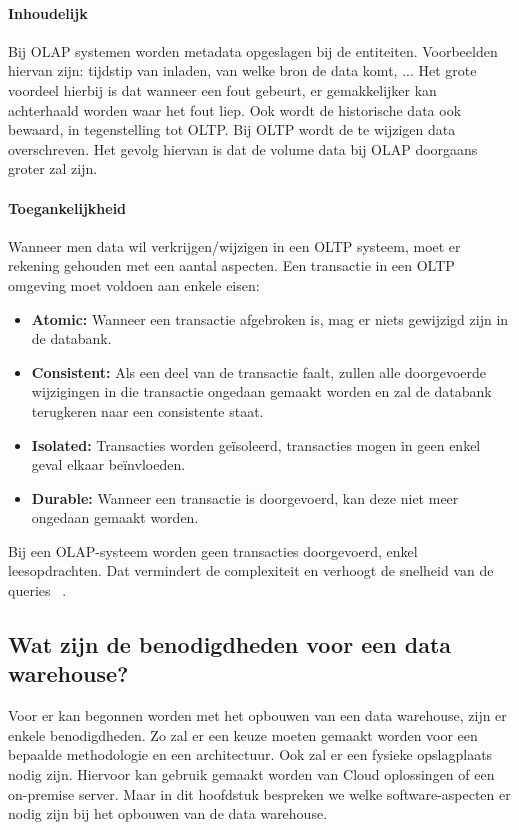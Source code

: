 \paragraph{Inhoudelijk}
Bij OLAP systemen worden metadata opgeslagen bij de entiteiten. Voorbeelden hiervan zijn: tijdstip van inladen, van welke bron de data komt, ... Het grote voordeel hierbij is dat wanneer een fout gebeurt, er gemakkelijker kan achterhaald worden waar het fout liep. Ook wordt de historische data ook bewaard, in tegenstelling tot OLTP. Bij OLTP wordt de te wijzigen data overschreven. Het gevolg hiervan is dat de volume data bij OLAP doorgaans groter zal zijn.

\paragraph{Toegankelijkheid}
Wanneer men data wil verkrijgen/wijzigen in een OLTP systeem, moet er rekening gehouden met een aantal aspecten. Een transactie in een OLTP omgeving moet voldoen aan enkele eisen:
\begin{itemize}
	\item \textbf{Atomic:} Wanneer een transactie afgebroken is, mag er niets gewijzigd zijn in de databank.
	\item \textbf{Consistent:} Als een deel van de transactie faalt, zullen alle doorgevoerde wijzigingen in die transactie ongedaan gemaakt worden en zal de databank terugkeren naar een consistente staat.
	\item \textbf{Isolated:} Transacties worden geïsoleerd, transacties mogen in geen enkel geval elkaar beïnvloeden.
	\item \textbf{Durable:} Wanneer een transactie is doorgevoerd, kan deze niet meer ongedaan gemaakt worden.
\end{itemize}  

Bij een OLAP-systeem worden geen transacties doorgevoerd, enkel leesopdrachten. Dat vermindert de complexiteit en verhoogt de snelheid van de queries ~\autocite{Satyanarayana2010}. 

\subsection{Wat zijn de benodigdheden voor een data warehouse?}
Voor er kan begonnen worden met het opbouwen van een data warehouse, zijn er enkele benodigdheden. Zo zal er een keuze moeten gemaakt worden voor een bepaalde methodologie en een architectuur. Ook zal er een fysieke opslagplaats nodig zijn. Hiervoor kan gebruik gemaakt worden van Cloud oplossingen of een on-premise server. Maar in dit hoofdstuk bespreken we welke software-aspecten er nodig zijn bij het opbouwen van de data warehouse.

